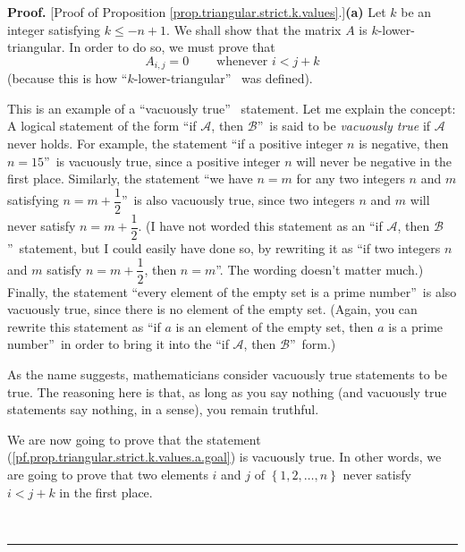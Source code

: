 \documentclass[numbers=enddot,12pt,final,onecolumn,notitlepage]{scrartcl}%
\theoremstyle{definition}
\newenvironment{proof}[1][Proof]{\noindent\textbf{#1.} }{\ \rule{0.5em}{0.5em}}
\begin{document}
\begin{proof}
[Proof of Proposition \ref{prop.triangular.strict.k.values}.]\textbf{(a)} Let
$k$ be an integer satisfying $k\leq-n+1$. We shall show that the matrix $A$ is
$k$-lower-triangular. In order to do so, we must prove that%
\begin{equation}
A_{i,j}=0\ \ \ \ \ \ \ \ \ \ \text{whenever }i<j+k
\label{pf.prop.triangular.strict.k.values.a.goal}%
\end{equation}
(because this is how \textquotedblleft$k$-lower-triangular\textquotedblright%
\ was defined).

This is an example of a \textquotedblleft vacuously true\textquotedblright%
\ statement. Let me explain the concept: A logical statement of the form
\textquotedblleft if $\mathcal{A}$, then $\mathcal{B}$\textquotedblright\ is
said to be \textit{vacuously true} if $\mathcal{A}$ never holds. For example,
the statement \textquotedblleft if a positive integer $n$ is negative, then
$n=15$\textquotedblright\ is vacuously true, since a positive integer $n$ will
never be negative in the first place. Similarly, the statement
\textquotedblleft we have $n=m$ for any two integers $n$ and $m$ satisfying
$n=m+\dfrac{1}{2}$\textquotedblright\ is also vacuously true, since two
integers $n$ and $m$ will never satisfy $n=m+\dfrac{1}{2}$. (I have not worded
this statement as an \textquotedblleft if $\mathcal{A}$, then $\mathcal{B}%
$\textquotedblright\ statement, but I could easily have done so, by rewriting
it as \textquotedblleft if two integers $n$ and $m$ satisfy $n=m+\dfrac{1}{2}%
$, then $n=m$\textquotedblright. The wording doesn't matter much.) Finally,
the statement \textquotedblleft every element of the empty set is a prime
number\textquotedblright\ is also vacuously true, since there is no element of
the empty set. (Again, you can rewrite this statement as \textquotedblleft if
$a$ is an element of the empty set, then $a$ is a prime
number\textquotedblright\ in order to bring it into the \textquotedblleft if
$\mathcal{A}$, then $\mathcal{B}$\textquotedblright\ form.)

As the name suggests, mathematicians consider vacuously true statements to be
true. The reasoning here is that, as long as you say nothing (and vacuously
true statements say nothing, in a sense), you remain truthful.

We are now going to prove that the statement
(\ref{pf.prop.triangular.strict.k.values.a.goal}) is vacuously true. In other
words, we are going to prove that two elements $i$ and $j$ of $\left\{
1,2,\ldots,n\right\}  $ never satisfy $i<j+k$ in the first place.


\end{proof}
\end{document}
